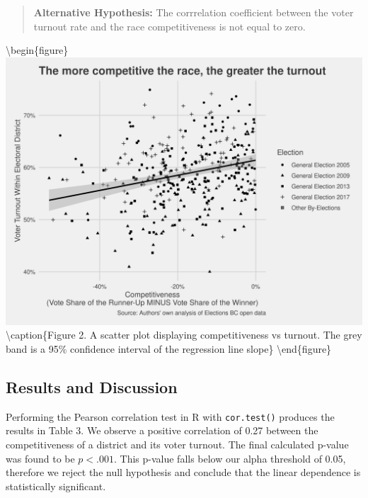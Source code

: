 \documentclass[
]{article}
\begin{document}
\begin{quote}
\textbf{Alternative Hypothesis:} The corrrelation coefficient between
the voter turnout rate and the race competitiveness is not equal to
zero.
\end{quote}

\textbackslash begin\{figure\}
\includegraphics[width=1\linewidth]{images/scatter_plot}
\textbackslash caption\{Figure 2. A scatter plot displaying
competitiveness vs turnout. The grey band is a 95\% confidence interval
of the regression line slope\}\label{fig:unnamed-chunk-3}
\textbackslash end\{figure\}

\hypertarget{results-and-discussion}{%
\subsection{Results and Discussion}\label{results-and-discussion}}

Performing the Pearson correlation test in R with \texttt{cor.test()}
produces the results in Table 3. We observe a positive correlation of
0.27 between the competitiveness of a district and its voter turnout.
The final calculated p-value was found to be \(p < .001\). This p-value
falls below our alpha threshold of 0.05, therefore we reject the null
hypothesis and conclude that the linear dependence is statistically
significant.
\end{document}
